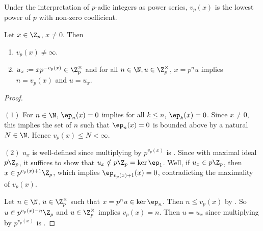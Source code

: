\begin{rmk}
  
  Under the interpretation of $p$-adic integers as power series, 
  $v_p(x)$ is the lowest power of $p$ with non-zero coefficient. 
\end{rmk}

\begin{prop}
  
  Let $x \in \Z_p$, $x \neq 0$. 
  Then \begin{enumerate}
    \item $v_p(x) \neq \infty$. 
    \item $u_x := x p^{-v_p(x)} \in \Z_p^\times$
    and for all $n \in \N, u \in \Z_p^\times$, 
    $x = p^n u$ implies $n = v_p(x)$ and $u = u_x$.
  \end{enumerate}
\end{prop}
\begin{proof}~

  $(1)$ For $n \in \N$, $\ep_n(x) = 0$ implies for all $k \leq n$, 
  $\ep_k(x) = 0$. 
  Since $x \neq 0$, this implies the set of $n$ such that 
  $\ep_n(x) = 0$ is bounded above by a natural $N \in \N$. 
  Hence $v_p(x) \leq N < \infty$. 
  
  $(2)$ $u_x$ is well-defined since multiplying by $p^{v_p(x)}$ is 
  . 
  Since  with 
  maximal ideal $p\Z_p$, it suffices to show that 
  $u_x \notin p\Z_p = \ker\ep_1$. 
  Well, if $u_x \in p\Z_p$, then $x \in p^{v_p(x)+1}\Z_p$, 
  which implies $\ep_{v_p(x) + 1}(x) = 0$, 
  contradicting the maximality of $v_p(x)$. 

  Let $n \in \N$, $u \in \Z_p^\times$ such that $x = p^n u \in \ker\ep_n$. 
  Then $n \leq v_p(x)$ by 
  . 
  So $u \in p^{v_p(x) - n}\Z_p$ and $u \in \Z_p^\times$
  implies $v_p(x) = n$. 
  Then $u = u_x$ since multiplying by $p^{v_p(x)}$ is 
  . 
\end{proof}

